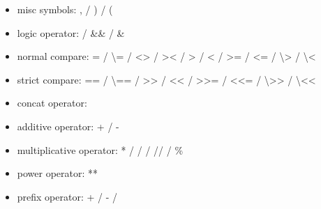 \begin{itemize}
\item misc symbols: \textquotesingle{},\textquotesingle{} / \textquotesingle{})\textquotesingle{} / \textquotesingle{}(\textquotesingle{}

\item logic operator: \textquotesingle{}\textbar{}\textquotesingle{} / \textquotesingle{}\&\&\textquotesingle{} / \textquotesingle{}\&\textquotesingle{}

\item normal compare: \textquotesingle{}=\textquotesingle{} / \textquotesingle{}\textbackslash{}=\textquotesingle{} / \textquotesingle{}\textless{}\textgreater{}\textquotesingle{} / \textquotesingle{}\textgreater{}\textless{}\textquotesingle{} / \textquotesingle{}\textgreater{}\textquotesingle{} / \textquotesingle{}\textless{}\textquotesingle{} / \textquotesingle{}\textgreater{}=\textquotesingle{} / \textquotesingle{}\textless{}=\textquotesingle{} / \textquotesingle{}\textbackslash{}\textgreater{}\textquotesingle{} / \textquotesingle{}\textbackslash{}\textless{}\textquotesingle{}

\item strict compare: \textquotesingle{}==\textquotesingle{} / \textquotesingle{}\textbackslash{}==\textquotesingle{} / \textquotesingle{}\textgreater{}\textgreater{}\textquotesingle{} / \textquotesingle{}\textless{}\textless{}\textquotesingle{} / \textquotesingle{}\textgreater{}\textgreater{}=\textquotesingle{} / \textquotesingle{}\textless{}\textless{}=\textquotesingle{} / \textquotesingle{}\textbackslash{}\textgreater{}\textgreater{}\textquotesingle{} / \textquotesingle{}\textbackslash{}\textless{}\textless{}\textquotesingle{}

\item concat operator: \textquotesingle{}\textbar{}\textbar{}\textquotesingle{}

\item additive operator:  \textquotesingle{}+\textquotesingle{} / \textquotesingle{}-\textquotesingle{}

\item multiplicative operator: \textquotesingle{}*\textquotesingle{} / \textquotesingle{}/\textquotesingle{} / \textquotesingle{}//\textquotesingle{} / \textquotesingle{}\%\textquotesingle{}

\item power operator: \textquotesingle{}**\textquotesingle{}

\item prefix operator: \textquotesingle{}+\textquotesingle{} / \textquotesingle{}-\textquotesingle{} / \textquotesingle{}\textquotesingle{}

\end{itemize}

